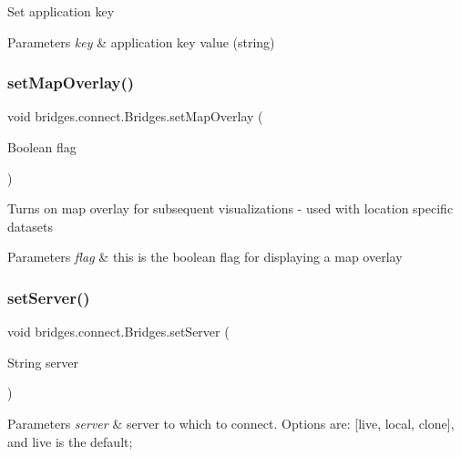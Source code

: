 Set application key


\begin{DoxyParams}{Parameters}
{\em key} & application key value (string) \\
\hline
\end{DoxyParams}
\mbox{\label{classbridges_1_1connect_1_1_bridges_a4af383ba2f114ad7bd4e08eb44096973}} 
\subsubsection{\texorpdfstring{set\+Map\+Overlay()}{setMapOverlay()}}
{\footnotesize\ttfamily void bridges.\+connect.\+Bridges.\+set\+Map\+Overlay (\begin{DoxyParamCaption}\item[{Boolean}]{flag }\end{DoxyParamCaption})}

Turns on map overlay for subsequent visualizations -\/ used with location specific datasets


\begin{DoxyParams}{Parameters}
{\em flag} & this is the boolean flag for displaying a map overlay \\
\hline
\end{DoxyParams}
\mbox{\label{classbridges_1_1connect_1_1_bridges_ab43e412448e1dfc340e58c407519a576}} 
\subsubsection{\texorpdfstring{set\+Server()}{setServer()}}
{\footnotesize\ttfamily void bridges.\+connect.\+Bridges.\+set\+Server (\begin{DoxyParamCaption}\item[{String}]{server }\end{DoxyParamCaption})}


\begin{DoxyParams}{Parameters}
{\em server} & server to which to connect. Options are\+: \mbox{[}\textquotesingle{}live\textquotesingle{}, \textquotesingle{}local\textquotesingle{}, \textquotesingle{}clone\textquotesingle{}\mbox{]}, and \textquotesingle{}live\textquotesingle{} is the default; \\
\hline
\end{DoxyParams}
\mbox{\label{classbridges_1_1connect_1_1_bridges_aed3752ee6318a48dff271d9a9e2a8fcc}} 
